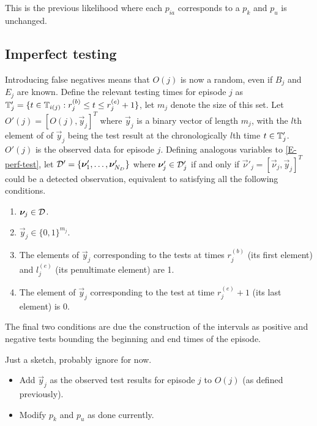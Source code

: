 \documentclass[thesis.tex]{subfiles}
\begin{document}
This is the previous likelihood where each $p_{ia}$ corresponds to a $p_k$ and $p_u$ is unchanged.

\subsection{Imperfect testing}

Introducing false negatives means that $O(j)$ is now a random, even if $B_j$ and $E_j$ are known.
Define the relevant testing times for episode $j$ as $\mathbb{T}'_j = \{ t \in \mathbb{T}_{i(j)} : r_j^{(b)} \leq t \leq r_j^{(e)} + 1 \}$, let $m_j$ denote the size of this set.
Let $O'(j) = [O(j), \vec{y}_j]^T$ where $\vec{y}_j$ is a binary vector of length $m_j$, with the $l$th element of of $\vec{y}_j$ being the test result at the chronologically $l$th time $t \in \mathbb{T}'_j$.
$O'(j)$ is the observed data for episode $j$.
Defining analogous variables to \cref{E-perf-test}, let $\mathcal{D}' = \{ \bm{\nu}'_1, \dots, \bm{\nu}'_{N_D} \}$ where $\bm{\nu}'_j \in \mathcal{D}'_j$ if and only if $\vec{\nu}'_j = [\vec{\nu}_j, \vec{y}_j]^T$ could be a detected observation, equivalent to satisfying all the following conditions.
\begin{enumerate}
  \item $\bm{\nu}_j \in \mathcal{D}$.
  \item $\vec{y}_j \in \{0, 1\}^{m_j}$.
  \item The elements of $\vec{y}_j$ corresponding to the tests at times $r_j^{(b)}$ (its first element) and $l_j^{(e)}$ (its penultimate element) are 1.
  \item The element of $\vec{y}_j$ corresponding to the test at time $r_j^{(e)} + 1$ (its last element) is 0.
\end{enumerate}
The final two conditions are due the construction of the intervals as positive and negative tests bounding the beginning and end times of the episode.

Just a sketch, probably ignore for now.

\begin{itemize}
  \item Add $\vec{y}_j$ as the observed test results for episode $j$ to $O(j)$ (as defined previously).
  \item Modify $p_k$ and $p_u$ as done currently.
\end{itemize}
\end{document}
